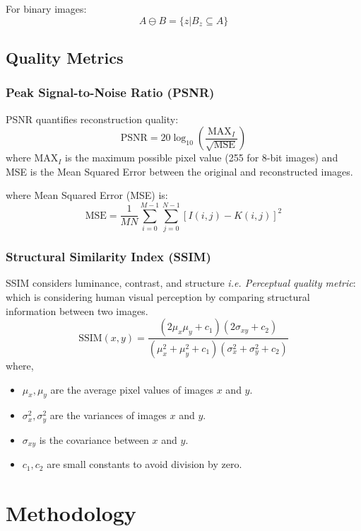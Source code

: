 \documentclass[a4paper, journal]{IEEEtran}
\begin{document}
For binary images:
\begin{equation}
    A \ominus B = \{z | B_z \subseteq A\}
\end{equation}

\subsection{Quality Metrics}
\subsubsection{Peak Signal-to-Noise Ratio (PSNR)}
PSNR quantifies reconstruction quality:
\begin{equation}
    \text{PSNR} = 20 \log_{10} \left(\frac{\text{MAX}_I}{\sqrt{\text{MSE}}}\right)
\end{equation}
where $\text{MAX}_I$ is the maximum possible pixel value (255 for 8-bit images) and MSE is the Mean Squared Error between the original and reconstructed images.

where Mean Squared Error (MSE) is:
\begin{equation}
    \text{MSE} = \frac{1}{MN} \sum_{i=0}^{M-1} \sum_{j=0}^{N-1} [I(i,j) - K(i,j)]^2
\end{equation}

\subsubsection{Structural Similarity Index (SSIM)}
SSIM considers luminance, contrast, and structure \emph{i.e. Perceptual quality metric}: which is considering human visual perception by comparing structural information between two images.
\begin{equation}
    \text{SSIM}(x,y) = \frac{(2\mu_x\mu_y + c_1)(2\sigma_{xy} + c_2)}{(\mu_x^2 + \mu_y^2 + c_1)(\sigma_x^2 + \sigma_y^2 + c_2)}
\end{equation}
where,
\begin{itemize}
    \item $\mu_x, \mu_y$ are the average pixel values of images $x$ and $y$.
    \item $\sigma_x^2, \sigma_y^2$ are the variances of images $x$ and $y$.
    \item $\sigma_{xy}$ is the covariance between $x$ and $y$.
    \item $c_1, c_2$ are small constants to avoid division by zero.
\end{itemize}

\section{Methodology}
\end{document}
